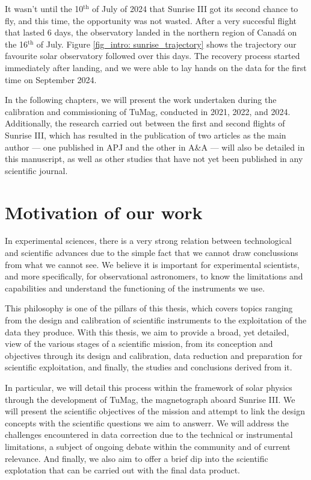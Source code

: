 It wasn't until the 10$^{\text{th}}$ of July of 2024 that Sunrise III got its second chance to fly, and this time, the opportunity was not wasted. After a very succesful flight that lasted 6 days, the observatory landed in the northern region of Canadá on the 16$^{\text{th}}$ of July. Figure \ref{fig_intro: sunrise_trajectory} shows the trajectory our favourite solar observatory followed over this days. The recovery process started immediately after landing, and we were able to lay hands on the data for the first time on September 2024. 

In the following chapters, we will present the work undertaken during the calibration and commissioning of TuMag, conducted in 2021, 2022, and 2024. Additionally, the research carried out between the first and second flights of Sunrise III, which has resulted in the publication of two articles as the main author — one published in APJ and the other in A\&A — will also be detailed in this manuscript, as well as other studies that have not yet been published in any scientific journal. 


\section{Motivation of our work}

In experimental sciences, there is a very strong relation between technological and scientific advances due to the simple fact that we cannot draw conclussions from what we cannot see. We believe it is important for experimental scientists, and more specifically, for observational astronomers, to know the limitations and capabilities and understand the functioning of the instruments we use. 

This philosophy is one of the pillars of this thesis, which covers topics ranging from the design and calibration of scientific instruments to the exploitation of the data they produce. With this thesis, we aim to provide a broad, yet detailed, view of the various stages of a scientific mission, from its conception and objectives through its design and calibration, data reduction and preparation for scientific exploitation, and finally, the studies and conclusions derived from it.

In particular, we will detail this process within the framework of solar physics through the development of TuMag, the magnetograph aboard Sunrise III. We will present the scientific objectives of the mission and attempt to link the design concepts with the scientific questions we aim to answerr. We will address the challenges encountered in data correction due to the technical or instrumental limitations, a subject of ongoing debate within the community and of current relevance. And finally, we also aim to offer a brief dip into the scientific explotation that can be carried out with the final data product. 

